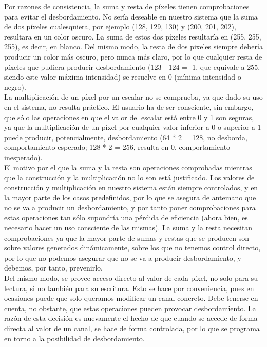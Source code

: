 Por razones de consistencia, la suma y resta de píxeles tienen comprobaciones para evitar el desbordamiento. No sería deseable en nuestro sistema que la suma de dos píxeles cualesquiera, por ejemplo (128, 129, 130) y (200, 201, 202), resultara en un color oscuro. La suma de estos dos píxeles resultaría en (255, 255, 255), es decir, en blanco. Del mismo modo, la resta de dos pixeles siempre debería producir un color más oscuro, pero nunca más claro, por lo que cualquier resta de píxeles que pudiera producir desbordamiento (123 - 124 = -1, que equivale a 255, siendo este valor máxima intensidad) se resuelve en 0 (mínima intensidad o negro).\\

La multiplicación de un píxel por un escalar no se comprueba, ya que dado su uso en el sistema, no resulta práctico. El usuario ha de ser consciente, sin embargo, que sólo las operaciones en que el valor del escalar está entre 0 y 1 son seguras, ya que la multiplicación de un píxel por cualquier valor inferior a 0 o superior a 1 puede producir, potencialmente, desbordamiento (64 * 2 = 128, no desborda, comportamiento esperado; 128 * 2 = 256, resulta en 0, comportamiento inesperado).\\

El motivo por el que la suma y la resta son operaciones comprobadas mientras que la construcción y la multiplicación no lo son está justificado. Los valores de construcción y multiplicación en nuestro sistema están siempre controlados, y en la mayor parte de los casos predefinidos, por lo que se asegura de antemano que no se va a producir un desbordamiento, y por tanto poner comprobaciones para estas operaciones tan sólo supondría una pérdida de eficiencia (ahora bien, es necesario hacer un uso consciente de las mismas). La suma y la resta necesitan comprobaciones ya que la mayor parte de sumas y restas que se producen son sobre valores generados dinámicamente, sobre los que no tenemos control directo, por lo que no podemos asegurar que no se va a producir desbordamiento, y debemos, por tanto, prevenirlo.\\

Del mismo modo, se provee acceso directo al valor de cada píxel, no solo para su lectura, si no también para su escritura. Esto se hace por conveniencia, pues en ocasiones puede que solo queramos modificar un canal concreto. Debe tenerse en cuenta, no obstante, que estas operaciones pueden provocar desbordamiento. La razón de esta decisión es nuevamente el hecho de que cuando se accede de forma directa al valor de un canal, se hace de forma controlada, por lo que se programa en torno a la posibilidad de desbordamiento.\\

